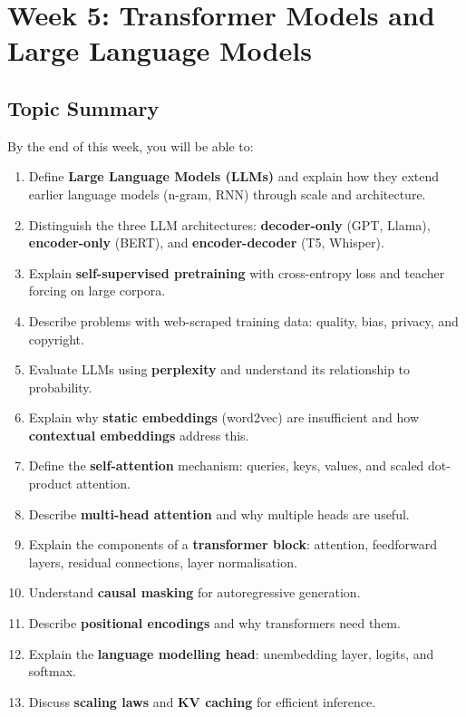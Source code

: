 \section{Week 5: Transformer Models and Large Language Models}

\subsection{Topic Summary}

\begin{keybox}
By the end of this week, you will be able to:
\begin{enumerate}
  \item Define \textbf{Large Language Models (LLMs)} and explain how they extend earlier language models (n-gram, RNN) through scale and architecture.
  \item Distinguish the three LLM architectures: \textbf{decoder-only} (GPT, Llama), \textbf{encoder-only} (BERT), and \textbf{encoder-decoder} (T5, Whisper).
  \item Explain \textbf{self-supervised pretraining} with cross-entropy loss and teacher forcing on large corpora.
  \item Describe problems with web-scraped training data: quality, bias, privacy, and copyright.
  \item Evaluate LLMs using \textbf{perplexity} and understand its relationship to probability.
  \item Explain why \textbf{static embeddings} (word2vec) are insufficient and how \textbf{contextual embeddings} address this.
  \item Define the \textbf{self-attention} mechanism: queries, keys, values, and scaled dot-product attention.
  \item Describe \textbf{multi-head attention} and why multiple heads are useful.
  \item Explain the components of a \textbf{transformer block}: attention, feedforward layers, residual connections, layer normalisation.
  \item Understand \textbf{causal masking} for autoregressive generation.
  \item Describe \textbf{positional encodings} and why transformers need them.
  \item Explain the \textbf{language modelling head}: unembedding layer, logits, and softmax.
  \item Discuss \textbf{scaling laws} and \textbf{KV caching} for efficient inference.
\end{enumerate}
\end{keybox}


